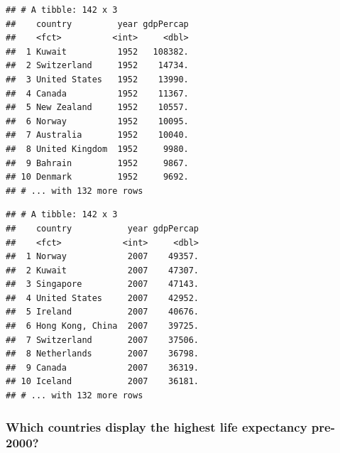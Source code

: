 \documentclass[11pt,]{article}
\newenvironment{Shaded}{\begin{snugshade}}{\end{snugshade}}
\newcommand{\KeywordTok}[1]{\textcolor[rgb]{0.13,0.29,0.53}{\textbf{#1}}}
\newcommand{\StringTok}[1]{\textcolor[rgb]{0.31,0.60,0.02}{#1}}
\newcommand{\CommentTok}[1]{\textcolor[rgb]{0.56,0.35,0.01}{\textit{#1}}}
\newcommand{\OperatorTok}[1]{\textcolor[rgb]{0.81,0.36,0.00}{\textbf{#1}}}
\newcommand{\NormalTok}[1]{#1}
\begin{document}
\begin{Shaded}
\end{Shaded}

\begin{verbatim}
## # A tibble: 142 x 3
##    country         year gdpPercap
##    <fct>          <int>     <dbl>
##  1 Kuwait          1952   108382.
##  2 Switzerland     1952    14734.
##  3 United States   1952    13990.
##  4 Canada          1952    11367.
##  5 New Zealand     1952    10557.
##  6 Norway          1952    10095.
##  7 Australia       1952    10040.
##  8 United Kingdom  1952     9980.
##  9 Bahrain         1952     9867.
## 10 Denmark         1952     9692.
## # ... with 132 more rows
\end{verbatim}

\begin{Shaded}
\end{Shaded}

\begin{verbatim}
## # A tibble: 142 x 3
##    country           year gdpPercap
##    <fct>            <int>     <dbl>
##  1 Norway            2007    49357.
##  2 Kuwait            2007    47307.
##  3 Singapore         2007    47143.
##  4 United States     2007    42952.
##  5 Ireland           2007    40676.
##  6 Hong Kong, China  2007    39725.
##  7 Switzerland       2007    37506.
##  8 Netherlands       2007    36798.
##  9 Canada            2007    36319.
## 10 Iceland           2007    36181.
## # ... with 132 more rows
\end{verbatim}

\subsubsection{Which countries display the highest life expectancy
pre-2000?}\label{which-countries-display-the-highest-life-expectancy-pre-2000}
\end{document}
